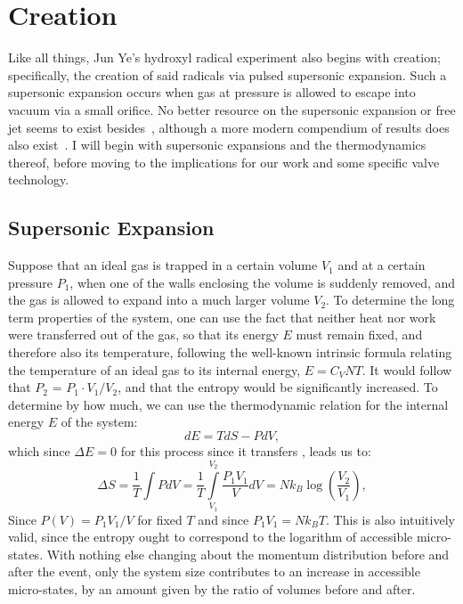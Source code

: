\ifx\justbeingincluded\undefined


\fi

\chapter{Creation}

Like all things, Jun Ye's hydroxyl radical experiment also begins with creation; specifically, the creation of said radicals via pulsed supersonic expansion. 
Such a supersonic expansion occurs when gas at pressure is allowed to escape into vacuum via a small orifice.
No better resource on the supersonic expansion or free jet seems to exist besides~\cite{Miller1988}, although a more modern compendium of results does also exist~\cite{Campargue2000}.
I will begin with supersonic expansions and the thermodynamics thereof, before moving to the implications for our work and some specific valve technology.

\section{Supersonic Expansion}

Suppose that an ideal gas is trapped in a certain volume $V_1$ and at a certain pressure $P_1$, when one of the walls enclosing the volume is suddenly removed, and the gas is allowed to expand into a much larger volume $V_2$.
To determine the long term properties of the system, one can use the fact that neither heat nor work were transferred out of the gas, so that its energy $E$ must remain fixed, and therefore also its temperature, following the well-known intrinsic formula relating the temperature of an ideal gas to its internal energy, $E = C_VNT$.
It would follow that $P_2$ = $P_1\cdot V_1/V_2$, and that the entropy would be significantly increased.
To determine by how much, we can use the thermodynamic relation for the internal energy $E$ of the system:
\begin{equation}
dE = TdS - PdV,
\end{equation}
which since $\Delta E=0$ for this process since it transfers , leads us to:
\begin{equation}
\Delta S = \frac{1}{T}\int PdV = \frac{1}{T}\int\limits_{V_1}^{V_2}\frac{P_1V_1}{V}dV = Nk_B\log{\left(\frac{V_2}{V_1}\right)},
\end{equation}
Since $P(V) = P_1V_1/V$ for fixed $T$ and since $P_1V_1 = Nk_BT$.
This is also intuitively valid, since the entropy ought to correspond to the logarithm of accessible micro-states.
With nothing else changing about the momentum distribution before and after the event, only the system size contributes to an increase in accessible micro-states, by an amount given by the ratio of volumes before and after.

